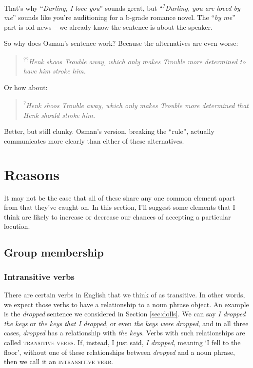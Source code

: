 That's why ``\textit{Darling, I love you}'' sounds great, but ``\textsuperscript{?}\textit{Darling, you are loved by me}'' sounds like you're auditioning for a b-grade romance novel. The ``\textit{by me}'' part is old news -- we already know the sentence is about the speaker.

So why does Osman's sentence work? Because the alternatives are even worse:

\begin{quote}
\textsuperscript{??}\textit{Henk shoos Trouble away, which only makes Trouble more determined to have him stroke him.}
\end{quote}

Or how about:

\begin{quote}
\textsuperscript{?}\textit{Henk shoos Trouble away, which only makes Trouble more determined that Henk should stroke him.}
\end{quote}

Better, but still clunky. Osman's version, breaking the ``rule'', actually communicates more clearly than either of these alternatives.

\section{Reasons}
It may not be the case that all of these share any one common element apart from that they've caught on. In this section, I'll suggest some elements that I think are likely to increase or decrease our chances of accepting a particular locution.

    \subsection{Group membership}
        \subsubsection*{Intransitive verbs} \label{sec:intrans}
            
            There are certain verbs in English that we think of as transitive. In other words, we expect those verbs to have a relationship to a noun phrase object. An example is the \textit{dropped} sentence we considered in Section \ref{sec:dolls}. We can say \textit{I dropped the keys} or \textit{the keys that I dropped}, or even \textit{the keys were dropped}, and in all three cases, \textit{dropped} has a relationship with \textit{the keys}. Verbs with such relationships are called \textsc{transitive verbs}. If, instead, I just said, \textit{I dropped}, meaning `I fell to the floor', without one of these relationships between \textit{dropped} and a noun phrase, then we call it an \textsc{intransitive verb}.
            
